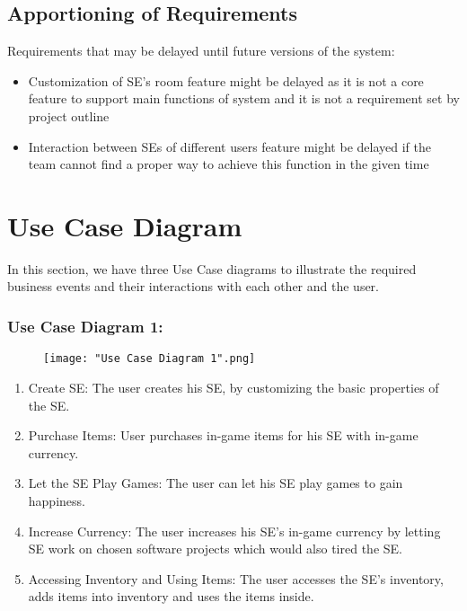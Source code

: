 \documentclass[]{article}
\begin{document}
\subsection{Apportioning of Requirements}
\label{sub:apportioning_of_requirements}
Requirements that may be delayed until future versions of the system:

\begin{itemize}
    \item Customization of SE’s room feature might be delayed as it is not a 
    core feature to support main functions of system and it is not a requirement 
    set by project outline
    \item Interaction between SEs of different users feature might be delayed 
    if the team cannot find a proper way to achieve this function in the given 
    time
\end{itemize}

\section{Use Case Diagram}
\label{sec:use_case_diagram}
In this section, we have three Use Case diagrams to illustrate the required 
business events and their interactions with each other and the user.

\subsubsection*{Use Case Diagram 1:}
\begin{figure}[H]
    \centering
    \texttt{[image: "Use Case Diagram 1".png]}
\end{figure}

\begin{enumerate}
    \item Create SE: The user creates his SE, by customizing the basic 
    properties of the SE.
    \item Purchase Items: User purchases in-game items for his SE with in-game 
    currency.
    \item Let the SE Play Games: The user can let his SE play games to gain 
    happiness.
    \item Increase Currency: The user increases his SE’s in-game currency by 
    letting SE work on chosen software projects which would also tired the SE.
    \item Accessing Inventory and Using Items: The user accesses the SE’s 
    inventory, adds items into inventory and uses the items inside.
\end{enumerate}
\end{document}
